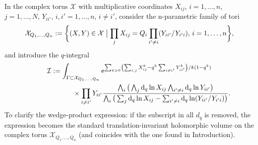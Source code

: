 \documentclass[pdftex]{sigma}
\numberwithin{equation}{section}
\def\I{\mathcal I}
\def\X{\mathcal X}
\begin{document}
In the complex torus $\X$ with multiplicative coordinates $X_{ij}$, $i=1,\dots,n$, $j=1,\dots,N$, $Y_{ii'}$, $i,i'=1,\dots,n$, $i\neq i'$, consider the n-parametric family of tori
\[
\X_{Q_1,\dots,Q_n}:=\bigg\{ (X,Y)\in \X \bigm| \prod_jX_{ij}=Q_i
\prod_{i'\neq i}(Y_{ii'}/Y_{i'i}),\, i=1,\dots, n \bigg\},
\]
and introduce the $q$-integral
\begin{gather*}
\I:= \int_{\Gamma\subset \X_{Q_1,\dots,Q_n}} {\rm e}^{ \sum_{k>0}\left(\sum_{i,j}X_{ij}^k -q^k\sum_{i\neq i'}Y_{ii'}^{k}\right)/k(1-q^k)}
\\ \hphantom{\I:= \int_{\Gamma\subset \X_{Q_1,\dots}}}
{}\times \prod_{i\neq i'} Y_{ii'} \frac{\bigwedge_i \big(\bigwedge_j {\rm d}_q\ln X_{ij} \bigwedge_{i'\neq i}{\rm d}_q\ln Y_{ii'}\big)}{\bigwedge_i
\big(\sum_j{\rm d}_q\ln X_{ij} -\sum_{i'\neq i}{\rm d}_q\ln (Y_{ii'}/Y_{i'i})\big)}.
\end{gather*}
To clarify the wedge-product expression: if the subscript in all $d_q$ is removed, the expression becomes the standard translation-invariant holomorphic volume on the complex torus $\X_{Q_1,\dots,Q_n}$ (and coincides with the one found in Introduction).
\end{document}
